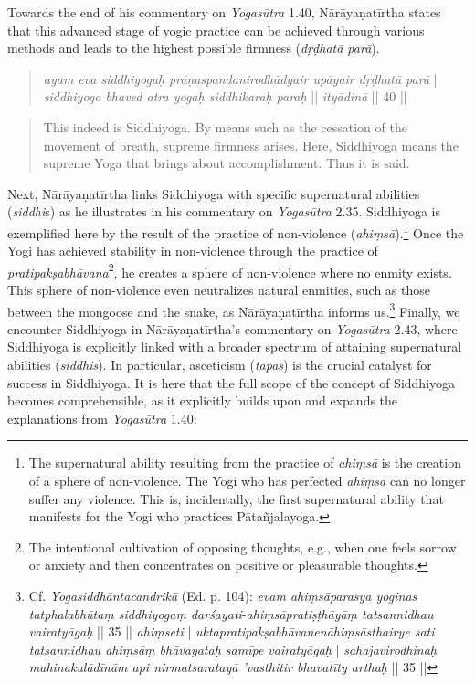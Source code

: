 Towards the end of his commentary on \textit{Yogasūtra} 1.40, Nārāyaṇatīrtha states that this advanced stage of yogic practice can be achieved through various methods and leads to the highest possible firmness (\textit{dṛḍhatā parā}).

\begin{quote}
  \textit{ayam eva siddhiyogaḥ}
  \textit{prāṇaspandanirodhādyair upāyair dṛḍhatā parā} | 
  \textit{siddhiyogo bhaved atra yogaḥ siddhikaraḥ paraḥ} ||
  \textit{ityādinā} || 40 ||
\end{quote}
\begin{quote}
  This indeed is Siddhiyoga. By means such as the cessation of the movement of breath, supreme firmness arises. Here, Siddhiyoga means the supreme Yoga that brings about accomplishment. Thus it is said.
\end{quote}

Next, Nārāyaṇatīrtha links Siddhiyoga with specific supernatural abilities (\textit{siddhi}s) as he illustrates in his commentary on \textit{Yogasūtra} 2.35. Siddhiyoga is exemplified here by the result of the practice of non-violence (\textit{ahiṃsā}).\footnote{The supernatural ability resulting from the practice of \textit{ahiṃsā} is the creation of a sphere of non-violence. The Yogi who has perfected \textit{ahiṃsā} can no longer suffer any violence. This is, incidentally, the first supernatural ability that manifests for the Yogi who practices Pātañjalayoga.} Once the Yogi has achieved stability in non-violence through the practice of \textit{pratipakṣabhāvana}\footnote{The intentional cultivation of opposing thoughts, e.g., when one feels sorrow or anxiety and then concentrates on positive or pleasurable thoughts.}, he creates a sphere of non-violence where no enmity exists. This sphere of non-violence even neutralizes natural enmities, such as those between the mongoose and the snake, as Nārāyaṇatīrtha informs us.\footnote{Cf. \textit{Yogasiddhāntacandrikā} (Ed. p. 104): \textit{evam ahiṃsāparasya yoginas tatphalabhūtaṃ siddhiyogaṃ darśayati}-\textit{ahiṃsāpratiṣṭhāyāṃ tatsannidhau vairatyāgaḥ} || 35 || \textit{ahiṃseti} | \textit{uktapratipakṣabhāvanenāhiṃsāsthairye sati tatsannidhau ahiṃsāṃ bhāvayataḥ samīpe vairatyāgaḥ} | \textit{sahajavirodhinaḥ mahinakulādīnām api nirmatsaratayā 'vasthitir bhavatīty arthaḥ} || 35 ||}
Finally, we encounter Siddhiyoga in Nārāyaṇatīrtha’s commentary on \textit{Yogasūtra} 2.43, where Siddhiyoga is explicitly linked with a broader spectrum of attaining supernatural abilities (\textit{siddhis}). In particular, asceticism (\textit{tapas}) is the crucial catalyst for success in Siddhiyoga. It is here that the full scope of the concept of Siddhiyoga becomes comprehensible, as it explicitly builds upon and expands the explanations from \textit{Yogasūtra} 1.40:

